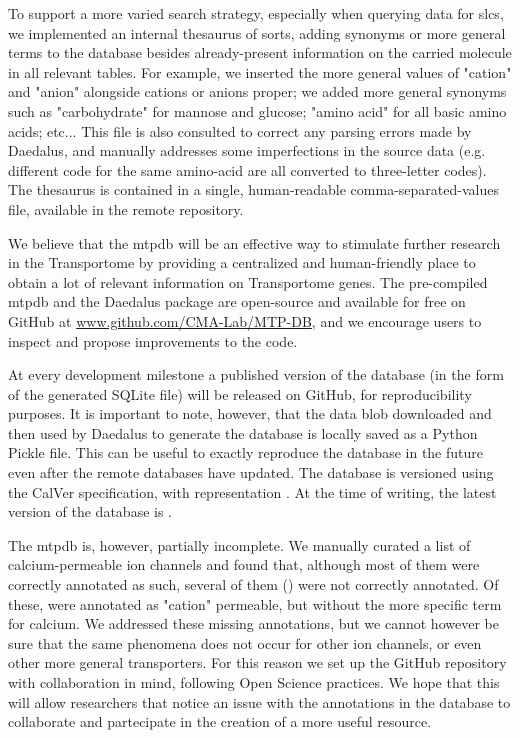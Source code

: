 To support a more varied search strategy, especially when querying data for
\glspl{slc}, we implemented an internal thesaurus of sorts, adding synonyms or
more general terms to the database besides already-present information on the
carried molecule in all relevant tables. For example, we inserted the more
general values of "cation" and "anion" alongside cations or anions proper; we
added more general synonyms such as "carbohydrate" for mannose and glucose;
"amino acid" for all basic amino acids; etc...
This file is also consulted to correct any parsing errors made by Daedalus, and manually addresses some imperfections in the source data (e.g. different code for the same amino-acid are all converted to three-letter codes).
The thesaurus is contained in a single, human-readable comma-separated-values file, available in the remote repository.

We believe that the \gls{mtpdb} will be an effective way to stimulate further
research in the Transportome by providing a centralized and human-friendly place
to obtain a lot of relevant information on Transportome genes. The pre-compiled
\gls{mtpdb} and the Daedalus package are open-source and available for free on
GitHub at
\href{https://github.com/CMA-Lab/MTP-DB/}{www.github.com/CMA-Lab/MTP-DB}, and we
encourage users to inspect and propose improvements to the code.

At every development milestone a published version of the database (in the form
of the generated SQLite file) will be released on GitHub, for reproducibility
purposes. It is important to note, however, that the data blob downloaded and
then used by Daedalus to generate the database is locally saved as a Python
Pickle file. This can be useful to exactly reproduce the database in the future
even after the remote databases have updated. The database is versioned using
the CalVer specification, with representation . At
the time of writing, the latest version of the database is .

The \gls{mtpdb} is, however, partially incomplete. We manually curated a list of
 calcium-permeable ion channels and found that, although
most of them were correctly annotated as such, several of them () were not correctly annotated. Of these,  were annotated
as "cation" permeable, but without the more specific term for calcium. We
addressed these missing annotations, but we cannot however be sure that the same
phenomena does not occur for other ion channels, or even other more general
transporters. For this reason we set up the GitHub repository with collaboration
in mind, following Open Science practices. We hope that this will allow
researchers that notice an issue with the annotations in the database to
collaborate and partecipate in the creation of a more useful resource.

